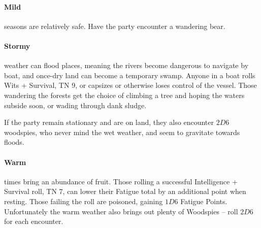 \begin{multicols}{2}
\paragraph{Mild} seasons are relatively safe.
Have the party encounter a wandering bear.

\paragraph{Stormy} weather can flood places, meaning the rivers become dangerous to navigate by boat, and once-dry land can become a temporary swamp.
Anyone in a boat rolls Wits + Survival, TN 9, or capsizes or otherwise loses control of the vessel.
Those wandering the forests get the choice of climbing a tree and hoping the waters subside soon, or wading through dank sludge.

If the party remain stationary and are on land, they also encounter $2D6$ woodspies, who never mind the wet weather, and seem to gravitate towards floods.

\paragraph{Warm} times bring an abundance of fruit.
Those rolling a successful Intelligence + Survival roll, TN 7, can lower their Fatigue total by an additional point when resting.
Those failing the roll are poisoned, gaining $1D6$ Fatigue Points.
Unfortunately the warm weather also brings out plenty of Woodspies -- roll $2D6$ for each encounter.

\iftoggle{players}{}{
\begin{encounters}{Quennome}

	Forest & Lakeside & Result \\\hline
	\li & Elvish enchanter (page \pageref{elven_enchanter}). \\
	\li & Mana Lake (page \pageref{mana_lake}). \\
	\li & Dryad (page \pageref{dryad}). \\
	\li \lii Basilisk (page \pageref{basilisk}). \\
	\li \lii $5D6\times 3$ Aurochs (\pageref{auroch}). \\
	\li \lii Chitincrawler (page \pageref{chitincrawler}). \\
	\li \lii $1D6+2$ Travelling elves (page \pageref{elf}). \\
	\li \lii $2D3-1$ Griffins (page \pageref{griffin}). \\
	\li \lii Seasonal Encounter. \\
	& \lii $3D6$ Heavily armed human traders. \\


\end{encounters}}
\end{multicols}
